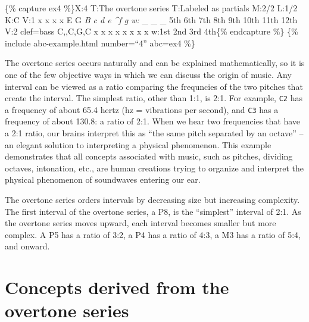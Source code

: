 \documentclass{book}
\begin{document}
\{\% capture ex4 \%\}X:4 T:The overtone series T:Labeled as partials M:2/2
L:1/2 K:C V:1 x x x x E G \emph{B c d e \^{}f g\textbar{]} w: } \_ \_ \_ 5th
6th 7th 8th 9th 10th 11th 12th V:2 clef=bass C,,C,G,C x x x x x x x
x\textbar{]} w:1st 2nd 3rd 4th\{\% endcapture \%\} \{\% include
abc-example.html number=``4'' abc=ex4 \%\}

The overtone series occurs naturally and can be explained mathematically, so
it is one of the few objective ways in which we can discuss the origin of
music. Any interval can be viewed as a ratio comparing the frequncies of the
two pitches that create the interval. The simplest ratio, other than 1:1, is
2:1. For example, \texttt{C2} has a frequency of about 65.4 hertz (hz =
vibrations per second), and \texttt{C3} has a frequency of about 130.8: a
ratio of 2:1. When we hear two frequencies that have a 2:1 ratio, our brains
interpret this as ``the same pitch separated by an octave'' -- an elegant
solution to interpreting a physical phenomenon. This example demonstrates that
all concepts associated with music, such as pitches, dividing octaves,
intonation, etc., are human creations trying to organize and interpret the
physical phenomenon of soundwaves entering our ear.

The overtone series orders intervals by decreasing size but increasing
complexity. The first interval of the overtone series, a P8, is the
``simplest'' interval of 2:1. As the overtone series moves upward, each
interval becomes smaller but more complex. A P5 has a ratio of 3:2, a P4 has a
ratio of 4:3, a M3 has a ratio of 5:4, and onward.

\hypertarget{concepts-derived-from-the-overtone-series}{%
\section{Concepts derived from the overtone
series}\label{concepts-derived-from-the-overtone-series}}
\end{document}
